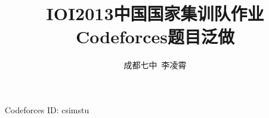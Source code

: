 \documentclass[a4paper]{article}
\begin{document}
\title{IOI2013中国国家集训队作业 \\ Codeforces题目泛做}
\author{成都七中\ 李凌霄}
\maketitle
\begin{center}
	Codeforces ID: csimstu
\end{center}
\tableofcontents











\end{document}
